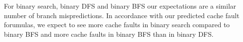 For binary search, binary DFS and binary BFS our expectations are a similar number of branch mispredictions. In accordance with our predicted cache fault forumulas, we expect to see more cache faults in binary search compared to binary BFS and more cache faults in binary BFS than in binary DFS.

